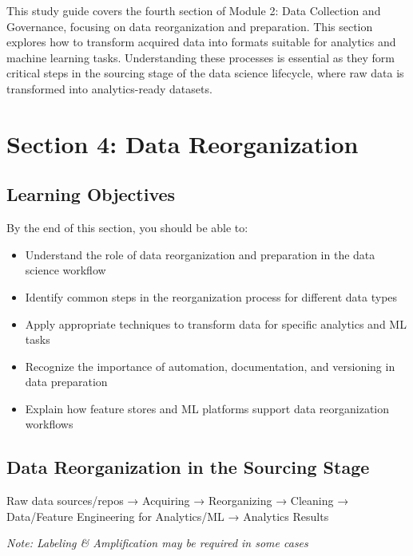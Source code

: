 \documentclass[12pt]{article}
\begin{document}
\newpage

\begin{tcolorbox}[colback=blue!5!white,colframe=blue!75!black,title={Section 4: Data Reorganization}]
This study guide covers the fourth section of Module 2: Data Collection and Governance, focusing on data reorganization and preparation. This section explores how to transform acquired data into formats suitable for analytics and machine learning tasks. Understanding these processes is essential as they form critical steps in the sourcing stage of the data science lifecycle, where raw data is transformed into analytics-ready datasets.
\end{tcolorbox}

\section{Section 4: Data Reorganization}

\subsection{Learning Objectives}

By the end of this section, you should be able to:

\begin{itemize}
    \item Understand the role of data reorganization and preparation in the data science workflow
    \item Identify common steps in the reorganization process for different data types
    \item Apply appropriate techniques to transform data for specific analytics and ML tasks
    \item Recognize the importance of automation, documentation, and versioning in data preparation
    \item Explain how feature stores and ML platforms support data reorganization workflows
\end{itemize}

\subsection{Data Reorganization in the Sourcing Stage}

\begin{tcolorbox}[colback=green!5!white,colframe=green!75!black,title={Sourcing Process Flow}]
Raw data sources/repos → Acquiring → Reorganizing → Cleaning → Data/Feature Engineering for Analytics/ML → Analytics Results

\textit{Note: Labeling \& Amplification may be required in some cases}
\end{tcolorbox}
\end{document}
